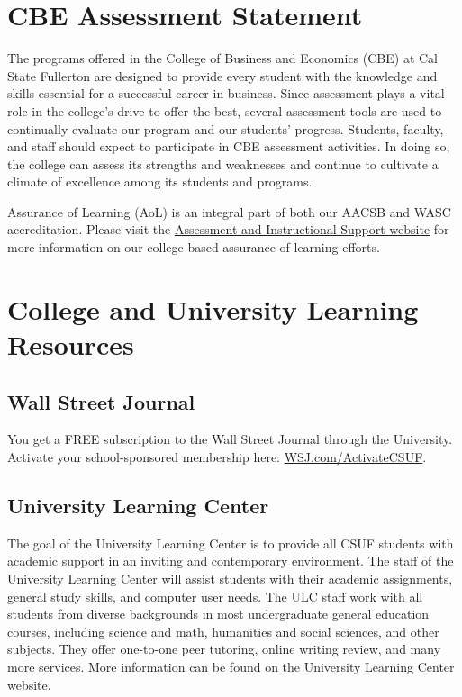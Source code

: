 \documentclass{./../latex/syllabus}
\begin{document}
\section*{CBE Assessment Statement}
The programs offered in the College of Business and Economics (CBE) at Cal State Fullerton are designed to provide every student with the knowledge and skills essential for a successful career in business. Since assessment plays a vital role in the college's drive to offer the best, several assessment tools are used to continually evaluate our program and our students' progress. Students, faculty, and staff should expect to participate in CBE assessment activities. In doing so, the college can assess its strengths and weaknesses and continue to cultivate a climate of excellence among its students and programs.

Assurance of Learning (AoL) is an integral part of both our AACSB and WASC accreditation. Please visit the \href{https://business.fullerton.edu/assessment}{Assessment and Instructional Support website} for more information on our college-based assurance of learning efforts.

\section*{College and University Learning Resources}

\subsection*{Wall Street Journal}
You get a FREE subscription to the Wall Street Journal through the University. Activate your school-sponsored membership here: \href{https://partner.wsj.com/p/1110800011/register?mod=wsj_CSUF_360}{WSJ.com/ActivateCSUF}.

\subsection*{University Learning Center}
The goal of the University Learning Center is to provide all CSUF students with academic support in an inviting and contemporary environment. The staff of the University Learning Center will assist students with their academic assignments, general study skills, and computer user needs. The ULC staff work with all students from diverse backgrounds in most undergraduate general education courses, including science and math, humanities and social sciences, and other subjects. They offer one-to-one peer tutoring, online writing review, and many more services. More information can be found on the University Learning Center website.
\end{document}
